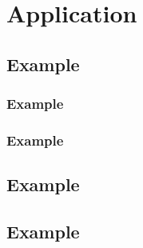 
\chapter{Application} %

\label{Chapter5} %



\section{Example}

\subsection{Example}

\subsection{Example}


\section{Example}


\section{Example}

